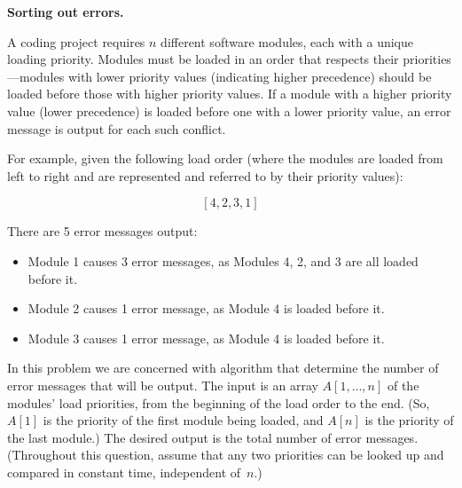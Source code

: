 \documentclass[11pt,addpoints,answers]{exam}
\begin{document}
\begin{questions}
\question \textbf{Sorting out errors.} \nopagebreak

  A coding project requires $n$ different software modules, each with a unique loading priority. Modules must be loaded in an order that respects their priorities---modules with lower priority values (indicating higher precedence) should be loaded before those with higher priority values. If a module with a higher priority value (lower precedence) is loaded before one with a lower priority value, an error message is output for each such conflict.

  For example, given the following load order (where the modules are loaded from left to right and are represented and referred to by their priority values):

  \[[4,2,3,1]\]

  There are 5 error messages output:
  \begin{itemize}
    \item Module 1 causes 3 error messages, as Modules 4, 2, and 3 are all loaded before it.
    \item Module 2 causes 1 error message, as Module 4 is loaded before it.
    \item Module 3 causes 1 error message, as Module 4 is loaded before it.
    \end{itemize}

  In this problem we are concerned with algorithm that determine the number of error messages that will be output.
  The input is an array $A[1,\ldots,n]$ of the modules' load priorities, from the beginning of the load order to the end.
  (So, $A[1]$ is the priority of the first module being loaded, and $A[n]$ is the priority of the last module.)
  The desired output is the total number of error messages.
  (Throughout this question, assume that any two priorities can be looked up and compared in constant time, independent of~$n$.)

\end{questions}
\end{document}
